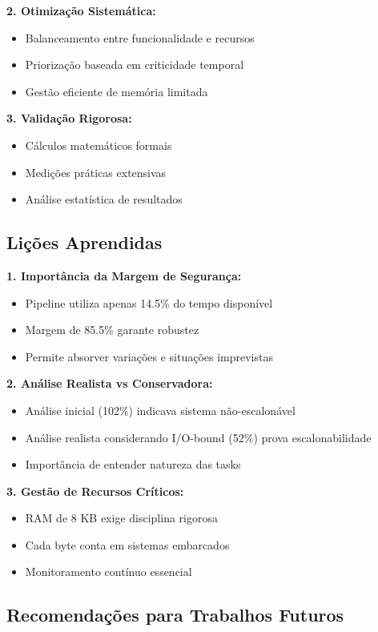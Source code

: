 \documentclass[12pt,a4paper]{article}
\begin{document}
\textbf{2. Otimização Sistemática:}
\begin{itemize}
    \item Balanceamento entre funcionalidade e recursos
    \item Priorização baseada em criticidade temporal
    \item Gestão eficiente de memória limitada
\end{itemize}

\textbf{3. Validação Rigorosa:}
\begin{itemize}
    \item Cálculos matemáticos formais
    \item Medições práticas extensivas
    \item Análise estatística de resultados
\end{itemize}

\subsection{Lições Aprendidas}

\textbf{1. Importância da Margem de Segurança:}
\begin{itemize}
    \item Pipeline utiliza apenas 14.5\% do tempo disponível
    \item Margem de 85.5\% garante robustez
    \item Permite absorver variações e situações imprevistas
\end{itemize}

\textbf{2. Análise Realista vs Conservadora:}
\begin{itemize}
    \item Análise inicial (102\%) indicava sistema não-escalonável
    \item Análise realista considerando I/O-bound (52\%) prova escalonabilidade
    \item Importância de entender natureza das tasks
\end{itemize}

\textbf{3. Gestão de Recursos Críticos:}
\begin{itemize}
    \item RAM de 8 KB exige disciplina rigorosa
    \item Cada byte conta em sistemas embarcados
    \item Monitoramento contínuo essencial
\end{itemize}

\subsection{Recomendações para Trabalhos Futuros}
\end{document}
